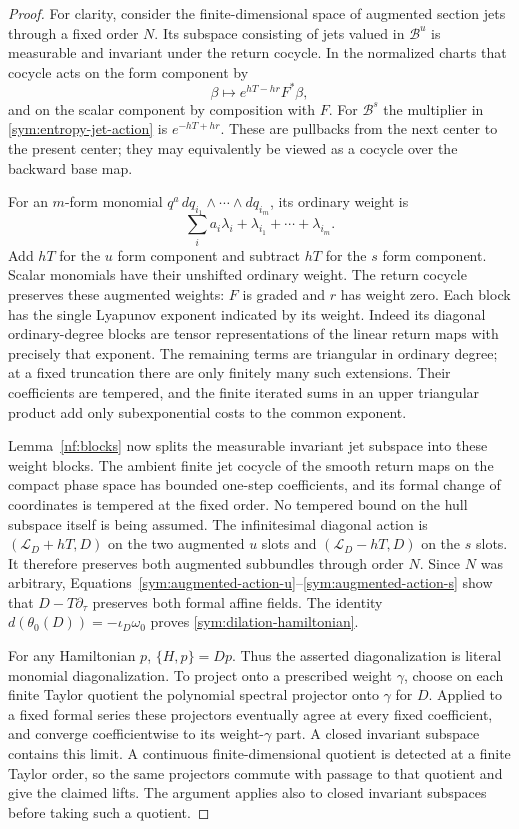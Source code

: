 \begin{proof}
For clarity, consider the finite-dimensional space of augmented
section jets through a fixed order $N$.  Its subspace consisting of
jets valued in $\mathcal B^u$ is measurable and invariant under the
return cocycle.  In the normalized charts that cocycle acts on the
form component by
\begin{equation}
 \label{sym:entropy-jet-action}
 \beta\longmapsto e^{hT-hr}F^*\beta,
\end{equation}
and on the scalar component by composition with $F$.  For
$\mathcal B^s$ the multiplier in
\eqref{sym:entropy-jet-action} is $e^{-hT+hr}$.
These are pullbacks from the next center to the present center; they
may equivalently be viewed as a cocycle over the backward base map.

For an $m$-form monomial
$q^a\,dq_{i_1}\wedge\cdots\wedge dq_{i_m}$, its ordinary weight is
\[
 \sum_i a_i\lambda_i+\lambda_{i_1}+\cdots+\lambda_{i_m}.
\]
Add $hT$ for the $u$ form component and subtract $hT$ for the $s$
form component.  Scalar monomials have their unshifted ordinary
weight.  The return cocycle preserves these augmented weights:
$F$ is graded and $r$ has weight zero.  Each block has the single
Lyapunov exponent indicated by its weight.  Indeed its diagonal
ordinary-degree blocks are tensor representations of the linear
return maps with precisely that exponent.  The remaining terms are
triangular in ordinary degree; at a fixed truncation there are only
finitely many such extensions.  Their coefficients are tempered,
and the finite iterated sums in an upper triangular product add
only subexponential costs to the common exponent.

Lemma~\ref{nf:blocks} now splits the measurable invariant jet subspace
into these weight blocks.  The ambient finite jet cocycle of the
smooth return maps on the compact phase space has bounded one-step
coefficients, and its formal change of coordinates is tempered at
the fixed order.  No tempered bound on the hull subspace itself is
being assumed.
The infinitesimal diagonal action is
$(\mathcal L_D+hT, D)$ on the two augmented $u$ slots and
$(\mathcal L_D-hT,D)$ on the $s$ slots.  It therefore preserves both
augmented subbundles through order $N$.  Since $N$ was arbitrary,
Equations~\eqref{sym:augmented-action-u}--\eqref{sym:augmented-action-s}
show that $D-T\partial_\tau$ preserves both formal affine fields.
The identity
$d(\theta_0(D))=-\iota_D\omega_0$ proves
\eqref{sym:dilation-hamiltonian}.

For any Hamiltonian $p$, $\{H,p\}=Dp$.  Thus the asserted
diagonalization is literal monomial diagonalization.  To project
onto a prescribed weight $\gamma$, choose on each finite Taylor
quotient the polynomial spectral projector onto $\gamma$ for $D$.
Applied to a fixed formal series these projectors eventually agree
at every fixed coefficient, and converge coefficientwise to its
weight-$\gamma$ part.  A closed invariant subspace contains this
limit.  A continuous finite-dimensional quotient is detected at a
finite Taylor order, so the same projectors commute with passage to
that quotient and give the claimed lifts.  The argument applies also
to closed invariant subspaces before taking such a quotient.


\end{proof}
